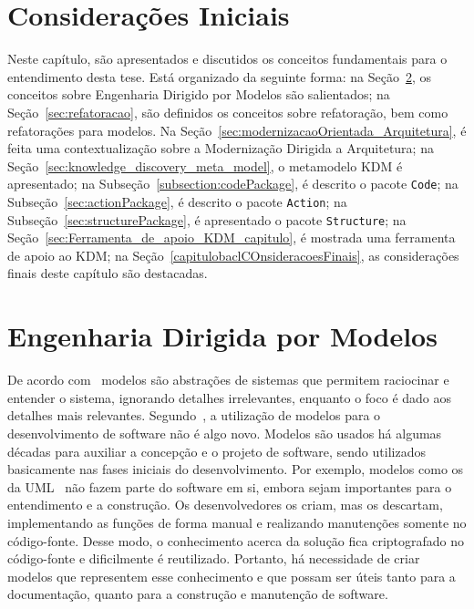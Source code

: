 
\section{Considerações Iniciais}

Neste capítulo, são apresentados e discutidos os conceitos fundamentais para o entendimento desta tese. Está organizado da seguinte forma: na Seção~\ref{Cap2_Sec2_Desenvolvimento_Dirigido_a_Modelos}, os conceitos sobre Engenharia Dirigido por Modelos são salientados; na Seção~\ref{sec:refatoracao}, são definidos os conceitos sobre refatoração, bem como refatorações para modelos. Na Seção~\ref{sec:modernizacaoOrientada_Arquitetura}, é feita uma contextualização sobre a Modernização Dirigida a Arquitetura; na Seção~\ref{sec:knowledge_discovery_meta_model}, o metamodelo KDM é apresentado; na Subseção~\ref{subsection:codePackage}, é descrito o pacote \texttt{Code}; na Subseção~\ref{sec:actionPackage}, é descrito o pacote \texttt{Action}; na Subseção~\ref{sec:structurePackage}, é apresentado o pacote \texttt{Structure}; na Seção~\ref{sec:Ferramenta_de_apoio_KDM_capitulo}, é mostrada uma ferramenta de apoio ao KDM; na Seção~\ref{capitulobaclCOnsideracoesFinais}, as considerações finais deste capítulo são destacadas.

\section{Engenharia Dirigida por Modelos}\label{Cap2_Sec2_Desenvolvimento_Dirigido_a_Modelos}

De acordo com~ modelos são abstrações de sistemas que permitem raciocinar e entender o sistema, ignorando detalhes irrelevantes, enquanto o foco é dado aos detalhes mais relevantes. Segundo~, a utilização de modelos para o desenvolvimento de software não é algo novo. Modelos são usados há algumas décadas para auxiliar a concepção e o projeto de software, sendo utilizados basicamente nas fases iniciais do desenvolvimento. Por exemplo, modelos como os da UML~\cite{UML:OMG} não fazem parte do software em si, embora sejam importantes para o entendimento e a construção. Os desenvolvedores os criam, mas os descartam, implementando as funções de forma manual e realizando manutenções somente no código-fonte. Desse modo, o conhecimento acerca da solução fica criptografado no código-fonte e dificilmente é reutilizado. Portanto, há necessidade de criar modelos que representem esse conhecimento e que possam ser úteis tanto para a documentação, quanto para a construção e manutenção de software.


